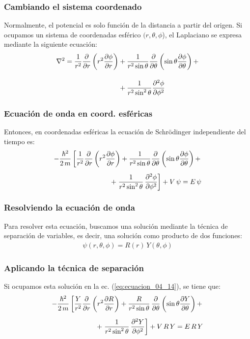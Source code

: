 \documentclass[12pt]{beamer}
\begin{document}
\begin{frame}
\frametitle{Cambiando el sistema coordenado}
Normalmente, el potencial es solo función de la distancia a partir del origen. Si ocupamos un sistema de coordenadas esférico $(r, \theta, \phi$), el Laplaciano se expresa mediante la siguiente ecuación:
\pause
\begin{align}
\begin{aligned}[b]
\laplacian = \dfrac{1}{r^{2}} \pdv{r} \left( r^{2} \pdv{\phi}{r} \right) &+ \dfrac{1}{r^{2} \sin \theta} \pdv{\theta} \left( \sin \theta \pdv{\phi}{\theta} \right) + \\[1em]
&+ \dfrac{1}{r^{2} \sin^{2} \theta} \pdv[2]{\phi}{\phi} 
\end{aligned}
\label{eq:ecuacion_04_13}
\end{align}
\end{frame}
\begin{frame}
\frametitle{Ecuación de onda en coord. esféricas}
Entonces, en coordenadas esféricas la ecuación de Schrödinger independiente del tiempo es:
\pause
\begin{align}
- \dfrac{\hbar^{2}}{2 \, m}  \left[ \dfrac{1}{r^{2}} \pdv{r} \left( r^{2} \pdv{\phi}{r} \right) + \dfrac{1}{r^{2} \sin \theta} \pdv{\theta} \left( \sin \theta \pdv{\phi}{\theta} \right) + \right. \nonumber \\[0.5em]
+ \left. \dfrac{1}{r^{2} \sin^{2} \theta} \, \pdv[2]{\phi}{\phi} \right] + V \, \psi = E \, \psi
\label{eq:ecuacion_04_14}
\end{align}
\end{frame}
\begin{frame}
\frametitle{Resolviendo la ecuación de onda}
Para resolver esta ecuación, buscamos una solución mediante la técnica de separación de variables, es decir, una solución como producto de dos funciones:
\pause
\begin{align}
\psi(r, \theta, \phi) = R(r) \, Y(\theta, \phi)
\label{eq:ecuacion_04_15}
\end{align}
\end{frame}
\begin{frame}
\frametitle{Aplicando la técnica de separación}
Si ocupamos esta solución en la ec. (\ref{eq:ecuacion_04_14}), se tiene que:
\pause
\begin{align*}
- \dfrac{\hbar^{2}}{2 \, m}  \left[ \dfrac{Y}{r^{2}} \pdv{r} \left( r^{2} \pdv{R}{r} \right) + \dfrac{R}{r^{2} \sin \theta} \, \pdv{\theta} \left( \sin \theta \pdv{Y}{\theta} \right) + \right. \nonumber \\[0.5em]
+ \left. \dfrac{1}{r^{2} \sin^{2} \theta} \, \pdv[2]{Y}{\phi} \right] + V \, R \, Y = E \, R \, Y
\end{align*}
\end{frame}
\end{document}
